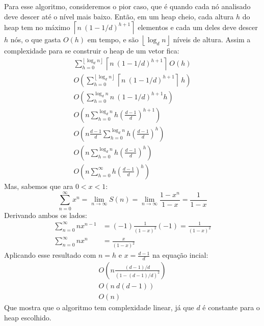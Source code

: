 Para esse algoritmo, consideremos o pior caso, que é quando cada nó analisado deve
descer até o nível mais baixo. Então, em um heap cheio, cada altura $h$ do heap tem no máximo
$\left\lceil n\ (1 - 1/d)^{h+1}\right\rceil$ elementos e cada um deles deve descer $h$ nós,
o que gasta $O(h)$ em tempo, e são $\left\lfloor\log_d n\right\rfloor$ níveis de altura. Assim a complexidade
para se construir o heap de um vetor fica:
\begin{gather*}
    \sum_{h = 0}^{\left\lfloor\log_d n\right\rfloor} \left\lceil n\ (1 - 1/d)^{h+1}\right\rceil\ O(h) \\
    O\left( \sum_{h = 0}^{\left\lfloor\log_d n\right\rfloor} \left\lceil n\ (1 - 1/d)^{h+1}\right\rceil\ h\right) \\
    O\left(\sum_{h = 0}^{\log_d n} n\ (1 - 1/d)^{h+1} h\right) \\
    O\left(n \sum_{h = 0}^{\log_d n} h \left(\frac{d - 1}{d}\right)^{h+1}\right) \\
    O\left(n \frac{d-1}{d} \sum_{h = 0}^{\log_d n} h \left(\frac{d - 1}{d}\right)^h\right) \\
    O\left(n \sum_{h = 0}^{\log_d n} h \left(\frac{d - 1}{d}\right)^h\right) \\
    O\left(n \sum_{h = 0}^{\infty} h \left(\frac{d - 1}{d}\right)^h\right)
\end{gather*}
Mas, sabemos que ara $0 < x < 1$:
$$\sum_{n = 0}^\infty x^n = \lim_{n\to\infty} S(n) =  \lim_{n\to\infty} \frac{1-x^n}{1-x} = \frac{1}{1-x}$$
Derivando ambos os lados:
\begin{align*}
    \sum_{n = 0}^\infty n x^{n-1} &= (-1) \frac{1}{(1-x)^2} (-1) = \frac{1}{(1-x)^2} \\
    \sum_{n = 0}^\infty n x^n &= \frac{x}{(1-x)^2}
\end{align*}
Aplicando esse resultado com $n = h$ e $x = \frac{d-1}{d}$ na equação incial:
\begin{gather*}
    O\left(n \frac{(d-1)/d}{(1 - (d-1)/d)^2}\right) \\
    O\left(n\ d(d-1)\right) \\
    O(n)
\end{gather*}
Que mostra que o algoritmo tem complexidade linear, já que $d$ é constante para o heap escolhido.